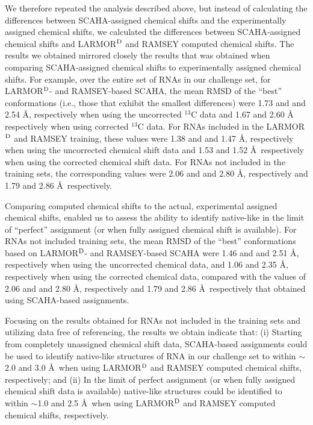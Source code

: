 \documentclass[journal=jcisd8,manuscript=article,layout=onecolumn]{achemso}
\begin{document}
We therefore repeated  the analysis described above, but instead of calculating the differences between SCAHA-assigned chemical shifts and the experimentally assigned chemical shifts, we calculated the differences between SCAHA-assigned chemical shifts and LARMOR$^{\rm D}$ and RAMSEY computed chemical shifts. The results we obtained mirrored closely the results that was obtained when comparing SCAHA-assigned chemical shifts to experimentally assigned chemical shifts. For example, over the entire set of RNAs in our challenge set, for LARMOR$^{\rm D}$- and RAMSEY-based SCAHA, the mean RMSD of the ``best'' conformations (i.e., those that exhibit the smallest differences) were 1.73 and  and 2.54 \AA, respectively when using the uncorrected $^{13}$C data and 1.67 and 2.60 \AA\, respectively when using corrected $^{13}$C data. %
For RNAs included in the LARMOR$^{\rm D}$ and RAMSEY training, these values were 1.38 and  and 1.47 \AA, respectively when using the uncorrected chemical shift data and 1.53 and 1.52 \AA\, respectively when using the corrected chemical shift data. For RNAs not included in the training sets, the corresponding values were 2.06 and  and 2.80 \AA, respectively and 1.79 and 2.86 \AA\, respectively. 

Comparing computed chemical shifts to the actual, experimental assigned chemical shifts, enabled us to assess the ability to identify native-like in the limit of ``perfect'' assignment (or when fully assigned chemical shift is available). For RNAs not included training sets, the mean RMSD of the ``best'' conformations based on LARMOR$^{\rm D}$- and RAMSEY-based SCAHA were 1.46 and  and 2.51 \AA, respectively when using the uncorrected chemical data, and 1.06 and 2.35 \AA, respectively when using the corrected chemical data, compared with the values of 2.06 and  and 2.80 \AA, respectively and 1.79 and 2.86 \AA\, respectively that obtained using SCAHA-based assignments. 

Focusing on the results obtained for RNAs not included in the training sets and utilizing data free of referencing, the results we obtain indicate that: (i) Starting from completely unassigned chemical shift data, SCAHA-based assignments could be used to identify  native-like structures of RNA in our challenge set to within $\sim$2.0 and 3.0 \AA\ when using LARMOR$^{\rm D}$ and RAMSEY computed chemical shifts, respectively;  and (ii) In the limit of perfect assignment (or when fully assigned chemical shift data is available) native-like  structures could be identified to within $\sim$1.0 and 2.5 \AA\ when using LARMOR$^{\rm D}$ and RAMSEY computed chemical shifts, respectively.
\end{document}
